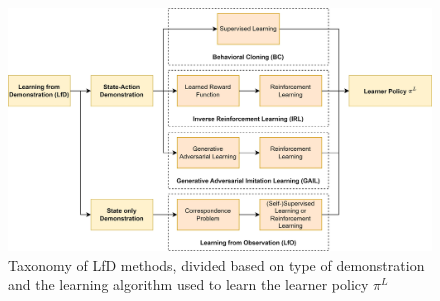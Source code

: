\begin{figure}[t]
    \centering
    \includegraphics[width=\textwidth]{figures/images/il_taxonomy.jpg}
    \caption{Taxonomy of LfD methods, divided based on type of demonstration and the learning algorithm used to learn the learner policy $\pi^{L}$ }
    \label{fig:il_taxonomy}
    
\end{figure}
